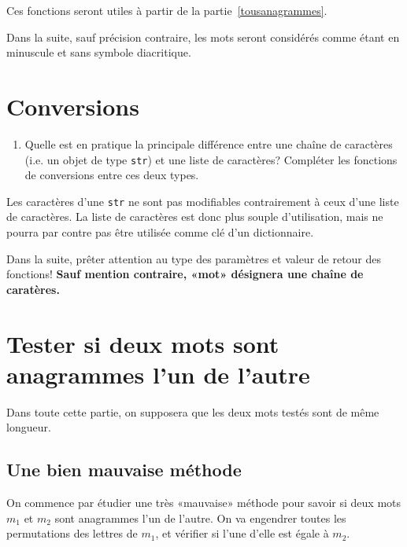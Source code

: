 \documentclass[10pt]{article}
\begin{document}
Ces fonctions seront utiles à partir de la partie~\ref{tousanagrammes}.

\medskip

Dans la suite, sauf précision contraire, les mots seront considérés comme étant en minuscule et sans symbole diacritique.

\section{Conversions}

\begin{enumerate}
\item Quelle est en pratique la principale différence entre une chaîne
  de caractères (i.e. un objet de type \verb+str+) et une liste de
  caractères? Compléter les fonctions de conversions entre ces deux
  types.
\end{enumerate}

\begin{correction}
  Les caractères d'une \verb+str+ ne sont pas modifiables
  contrairement à ceux d'une liste de caractères. La liste de
  caractères est donc plus souple d'utilisation, mais ne pourra par
  contre pas être utilisée comme clé d'un dictionnaire.
\end{correction}

Dans la suite, prêter attention au type des paramètres et valeur de retour des fonctions! \textbf{Sauf mention contraire, «mot» désignera une chaîne de caratères.}

\section{Tester si deux mots sont anagrammes l'un de l'autre}

Dans toute cette partie, on supposera que les deux mots testés sont
de même longueur.

\subsection*{Une bien mauvaise méthode}

On commence par étudier une très «mauvaise» méthode pour savoir si
deux mots $m_1$ et $m_2$ sont anagrammes l'un de l'autre. On va
engendrer toutes les permutations des lettres de $m_1$, et vérifier si
l'une d'elle est égale à $m_2$.
\end{document}
